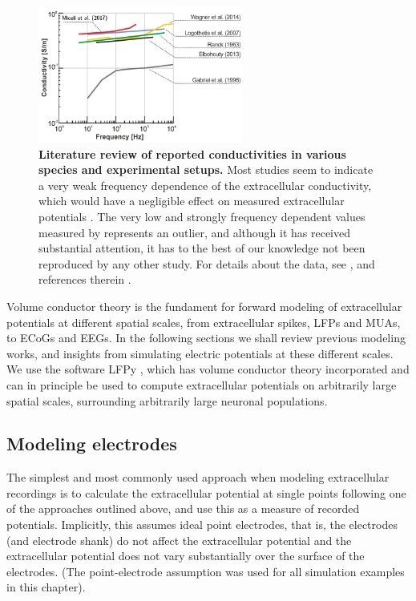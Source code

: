 \documentclass[preprint,11pt,authoryear]{elsarticle}
\begin{document}
\begin{figure}[!ht]
\begin{center}
\includegraphics[width=0.6\textwidth]{frequency_dependence}
\end{center}
\caption{\textbf{Literature review of reported conductivities in various species and experimental setups.} 
Most studies seem to indicate a very weak frequency dependence of the extracellular conductivity, which would have a negligible effect on measured extracellular potentials \citep{Miceli2017}. The very low and strongly frequency dependent values measured by \cite{Gabriel1996} represents an outlier, and although it has received substantial attention, it has to the best of our knowledge not been reproduced by any other study.
For details about the data, see \citep{Miceli2017}, and references therein \citep{Ranck1963, Gabriel1996, Logothetis2007, Elbohouty2013, Wagner2014}.
}
\label{fig:freq_dep}
\end{figure}


Volume conductor theory is the fundament for forward modeling of extracellular potentials at different spatial scales, from extracellular spikes, LFPs and MUAs, to ECoGs and EEGs. In the following sections we shall review previous modeling works, and insights from simulating electric potentials at these different scales.
We use the software LFPy \citep{Linden2014, Hagen2018, Hagen2019}, which has volume conductor theory incorporated and can in principle be used to compute extracellular potentials on arbitrarily large spatial scales, surrounding arbitrarily large neuronal populations. 

\subsection{Modeling electrodes}

The simplest and most commonly used approach when modeling extracellular recordings is to calculate the extracellular potential at single points following one of the approaches outlined above, and use this as a measure of recorded potentials. Implicitly, this 
assumes ideal point electrodes, that is, the electrodes (and electrode shank) do not affect the extracellular potential and the extracellular potential does not vary substantially over the surface of the electrodes. (The point-electrode assumption was used for all simulation examples in this chapter).
\end{document}
